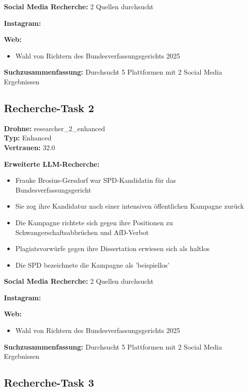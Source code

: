 \documentclass[12pt,a4paper]{article}
\begin{document}
\textbf{Social Media Recherche:} 2 Quellen durchsucht

\textbf{Instagram:}
\begin{itemize}
\end{itemize}

\textbf{Web:}
\begin{itemize}
\item Wahl von Richtern des Bundesverfassungsgerichts 2025
\end{itemize}

\textbf{Suchzusammenfassung:} Durchsucht 5 Plattformen mit 2 Social Media Ergebnissen

\subsection{Recherche-Task 2}

\textbf{Drohne:} researcher\_2\_enhanced\\
\textbf{Typ:} Enhanced\\
\textbf{Vertrauen:} 32.0%

\textbf{Erweiterte LLM-Recherche:}
\begin{itemize}
\item Frauke Brosius-Gersdorf war SPD-Kandidatin für das Bundesverfassungsgericht
\item Sie zog ihre Kandidatur nach einer intensiven öffentlichen Kampagne zurück
\item Die Kampagne richtete sich gegen ihre Positionen zu Schwangerschaftsabbrüchen und AfD-Verbot
\item Plagiatsvorwürfe gegen ihre Dissertation erwiesen sich als haltlos
\item Die SPD bezeichnete die Kampagne als 'beispiellos'
\end{itemize}

\textbf{Social Media Recherche:} 2 Quellen durchsucht

\textbf{Instagram:}
\begin{itemize}
\end{itemize}

\textbf{Web:}
\begin{itemize}
\item Wahl von Richtern des Bundesverfassungsgerichts 2025
\end{itemize}

\textbf{Suchzusammenfassung:} Durchsucht 5 Plattformen mit 2 Social Media Ergebnissen

\subsection{Recherche-Task 3}
\end{document}
